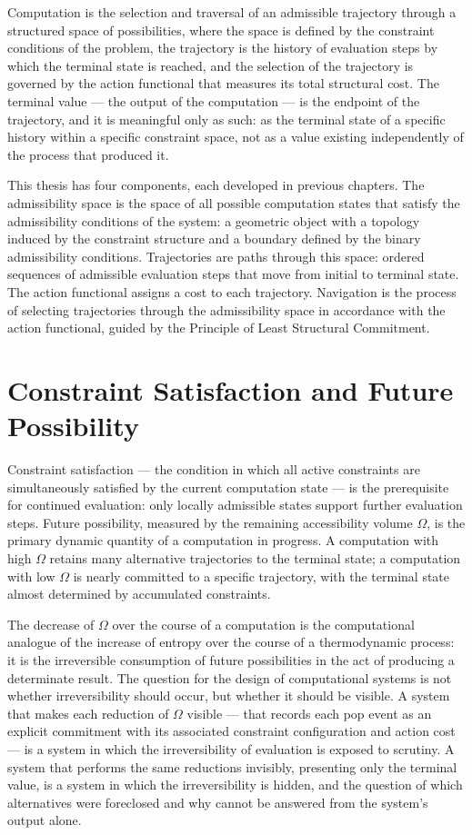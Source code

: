 \documentclass[12pt,openany]{book}
\theoremstyle{plain}
\theoremstyle{definition}
\theoremstyle{remark}
\begin{document}
Computation is the selection and traversal of an admissible trajectory through a structured space of possibilities, where the space is defined by the constraint conditions of the problem, the trajectory is the history of evaluation steps by which the terminal state is reached, and the selection of the trajectory is governed by the action functional that measures its total structural cost. The terminal value — the output of the computation — is the endpoint of the trajectory, and it is meaningful only as such: as the terminal state of a specific history within a specific constraint space, not as a value existing independently of the process that produced it.

This thesis has four components, each developed in previous chapters. The admissibility space is the space of all possible computation states that satisfy the admissibility conditions of the system: a geometric object with a topology induced by the constraint structure and a boundary defined by the binary admissibility conditions. Trajectories are paths through this space: ordered sequences of admissible evaluation steps that move from initial to terminal state. The action functional assigns a cost to each trajectory. Navigation is the process of selecting trajectories through the admissibility space in accordance with the action functional, guided by the Principle of Least Structural Commitment.

\section{Constraint Satisfaction and Future Possibility}

Constraint satisfaction — the condition in which all active constraints are simultaneously satisfied by the current computation state — is the prerequisite for continued evaluation: only locally admissible states support further evaluation steps. Future possibility, measured by the remaining accessibility volume $\Omega$, is the primary dynamic quantity of a computation in progress. A computation with high $\Omega$ retains many alternative trajectories to the terminal state; a computation with low $\Omega$ is nearly committed to a specific trajectory, with the terminal state almost determined by accumulated constraints.

The decrease of $\Omega$ over the course of a computation is the computational analogue of the increase of entropy over the course of a thermodynamic process: it is the irreversible consumption of future possibilities in the act of producing a determinate result. The question for the design of computational systems is not whether irreversibility should occur, but whether it should be visible. A system that makes each reduction of $\Omega$ visible — that records each pop event as an explicit commitment with its associated constraint configuration and action cost — is a system in which the irreversibility of evaluation is exposed to scrutiny. A system that performs the same reductions invisibly, presenting only the terminal value, is a system in which the irreversibility is hidden, and the question of which alternatives were foreclosed and why cannot be answered from the system's output alone.
\end{document}
